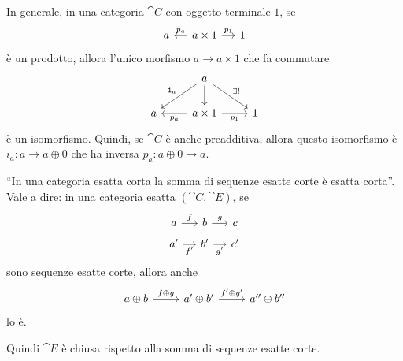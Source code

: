 \begin{recall}
  In generale, in una categoria \(\cat C\) con oggetto terminale
  \(1\), se
  \[
    \begin{tikzcd}[column sep=small]
      a & a \times 1 \ar["{p_a}", l, swap] \ar["{p_1}", r] & 1 
    \end{tikzcd}
  \]
  è un prodotto, allora l'unico morfismo \(a \to a \times 1\) che fa
  commutare
  \[
    \begin{tikzcd}
      & a \ar["{\id_a}", dl, swap] \ar["{}", d]  \ar["{\exists!}",dr] \\
      a & a \times 1 \ar["{p_a}", l] \ar["{p_1}", r, swap] & 1
    \end{tikzcd}
  \]
  è un isomorfismo. Quindi, se \(\cat C\) è anche preadditiva, allora
  questo isomorfismo è \(i_a : a \to a \oplus 0\) che ha inversa \(p_a : a \oplus
  0 \to a\).
\end{recall}

\begin{proposition}
  ``In una categoria esatta corta la somma di sequenze esatte corte è
  esatta corta''. Vale a dire: in una categoria esatta
  \((\cat C,\cat E)\), se
  \[
    \begin{tikzcd}[row sep=tiny, column sep=small]
      a \ar["{f}", r] & b \ar["{g}", r] & c \\
      a' \ar["{f'}", r, swap] & b' \ar["{g'}", r, swap] & c'
    \end{tikzcd}
  \]
  sono sequenze esatte corte, allora anche
  \begin{equation}
    \label{cd:SumExactSeqs}
    \begin{tikzcd}[row sep=small]
      a \oplus b \ar["{f \oplus g}", r] & a' \oplus b' \ar["{f' \oplus
        g'}", r] & a'' \oplus b''
    \end{tikzcd}
  \end{equation}
  lo è.
\end{proposition}

Quindi \(\cat E\) è chiusa rispetto alla somma di sequenze esatte corte.

